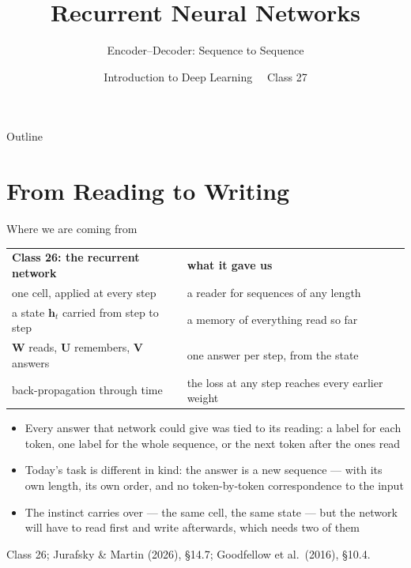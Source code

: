 \documentclass[aspectratio=169, 11pt]{beamer}
\title{Recurrent Neural Networks}
\subtitle{Encoder--Decoder: Sequence to Sequence}
\author{Introduction to Deep Learning \ \textperiodcentered\ Class 27}
\institute{}
\date{}
\newcommand{\srcline}[1]{%
  \par\vspace{0.25em}%
  {\scriptsize\color{mcMuted}\hfill #1\par}}
\newcommand{\src}[3]{}      %
\newcommand{\nosrc}{}       %
\begin{document}
\maketitle

\begin{frame}{Outline}
  \nosrc
  \tableofcontents
\end{frame}

\section{From Reading to Writing}

\begin{frame}{Where we are coming from}
  \src{jurafsky_slp3}{section}{14.7}
  \src{goodfellow2016}{section}{10.4}
  \vspace{-0.3em}
  {\scriptsize
  \renewcommand{\arraystretch}{1.3}
  \begin{tabular}{@{}l@{\hspace{1.2em}}l@{}}
    \textbf{Class 26: the recurrent network} & \textbf{what it gave us}\\
    one cell, applied at every step & a reader for sequences of any length\\
    a state $\mathbf{h}_t$ carried from step to step & a memory of everything read so far\\
    $\mathbf{W}$ reads, $\mathbf{U}$ remembers, $\mathbf{V}$ answers & one answer per step, from the state\\
    back-propagation through time & the loss at any step reaches every earlier weight\\
  \end{tabular}}
  \vspace{0.4em}

  {\footnotesize
  \begin{itemize}\itemsep0.2em
    \item Every answer that network could give was tied to its reading:
          a label \alert{for each} token, one label \alert{for the whole}
          sequence, or the \alert{next} token after the ones read
    \item Today's task is different in kind: the answer is a
          \alert{new sequence} --- with its own length, its own order, and
          no token-by-token correspondence to the input
    \item The instinct carries over --- the same cell, the same state ---
          but the network will have to \alert{read first and write
          afterwards}, which needs two of them
  \end{itemize}}
  \srcline{Class 26; Jurafsky \& Martin (2026), \S14.7; Goodfellow et al.\ (2016), \S10.4.}
\end{frame}
\end{document}

